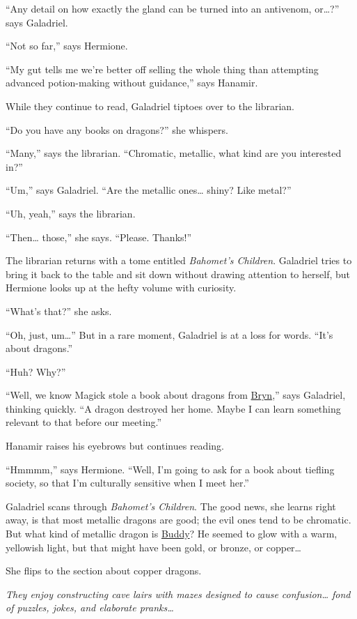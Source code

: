 \documentclass[smalldemyvopaper,11pt,twoside,onecolumn,openright,extrafontsizes]{memoir}
\begin{document}
``Any detail on how exactly the gland can be turned into an antivenom,
or\ldots?'' says Galadriel.

``Not so far,'' says Hermione.

``My gut tells me we're better off selling the whole thing than
attempting advanced potion-making without guidance,'' says Hanamir.

While they continue to read, Galadriel tiptoes over to the librarian.

``Do you have any books on dragons?'' she whispers.

``Many,'' says the librarian. ``Chromatic, metallic, what kind are you
interested in?''

``Um,'' says Galadriel. ``Are the metallic ones\ldots{} shiny? Like
metal?''

``Uh, yeah,'' says the librarian.

``Then\ldots{} those,'' she says. ``Please. Thanks!''

The librarian returns with a tome entitled \emph{Bahomet's Children}.
Galadriel tries to bring it back to the table and sit down without
drawing attention to herself, but Hermione looks up at the hefty volume
with curiosity.

``What's that?'' she asks.

``Oh, just, um\ldots{}'' But in a rare moment, Galadriel is at a loss
for words. ``It's about dragons.''

``Huh? Why?''

``Well, we know Magick stole a book about dragons from
\href{/characters/bryn/}{Bryn},'' says Galadriel, thinking quickly. ``A
dragon destroyed her home. Maybe I can learn something relevant to that
before our meeting.''

Hanamir raises his eyebrows but continues reading.

``Hmmmm,'' says Hermione. ``Well, I'm going to ask for a book about
tiefling society, so that I'm culturally sensitive when I meet her.''

Galadriel scans through \emph{Bahomet's Children}. The good news, she
learns right away, is that most metallic dragons are good; the evil ones
tend to be chromatic. But what kind of metallic dragon is
\href{/characters/buddy/}{Buddy}? He seemed to glow with a warm,
yellowish light, but that might have been gold, or bronze, or
copper\ldots{}

She flips to the section about copper dragons.

\emph{They enjoy constructing cave lairs with mazes designed to cause
confusion\ldots{} fond of puzzles, jokes, and elaborate pranks\ldots{}}
\end{document}
